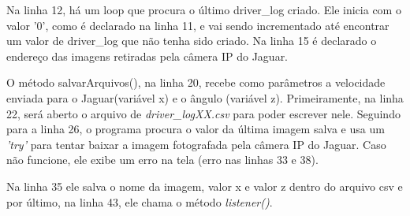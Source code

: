 Na linha 12, há um loop que procura o último driver\_log criado. Ele inicia com o valor '0', como é declarado na linha 11, e vai sendo incrementado até encontrar um valor de driver\_log que não tenha sido criado.
Na linha 15 é declarado o endereço das imagens retiradas pela câmera IP do Jaguar.

	\begin{figure}[H]
		\centering
\end{figure}

O método salvarArquivos(), na linha 20, recebe como parâmetros a velocidade enviada para o Jaguar(variável x) e o ângulo (variável z). Primeiramente, na linha 22, será aberto o arquivo de \textit{driver\_logXX.csv} para poder escrever nele. Seguindo para a linha 26, o programa procura o valor da última imagem salva e usa um \textit{'try'} para tentar baixar a imagem fotografada pela câmera IP do Jaguar. Caso não funcione, ele exibe um erro na tela (erro nas linhas 33 e 38). 

Na linha 35 ele salva o nome da imagem, valor x e valor z dentro do arquivo csv e por último, na linha 43, ele chama o método \textit{listener()}.

	\begin{figure}[H]
		\centering
\end{figure}

